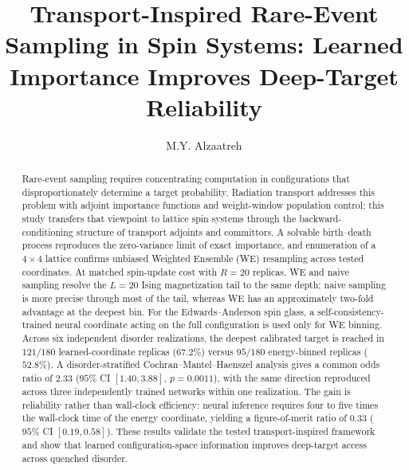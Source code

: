 \documentclass[a4paper,fleqn]{cas-sc}
\begin{document}
\let\WriteBookmarks\relax
\def\floatpagepagefraction{1}
\def\textpagefraction{.001}


\title[mode=title]{Transport-Inspired Rare-Event Sampling in Spin Systems: Learned
Importance Improves Deep-Target Reliability}

\author{M.Y. Alzaatreh}
\cormark[1]



\begin{abstract}
Rare-event sampling requires concentrating computation in configurations that disproportionately determine a target probability. Radiation transport addresses this problem with adjoint importance functions and weight-window population control; this study transfers that viewpoint to lattice spin systems through the backward-conditioning structure of transport adjoints and committors. A solvable birth--death process reproduces the zero-variance limit of exact importance, and enumeration of a $4\times4$ lattice confirms unbiased Weighted Ensemble (WE) resampling across tested coordinates. At matched spin-update cost with $R=20$ replicas, WE and naive sampling resolve the $L=20$ Ising magnetization tail to the same depth; naive sampling is more precise through most of the tail, whereas WE has an approximately two-fold advantage at the deepest bin. For the Edwards--Anderson spin glass, a self-consistency-trained neural coordinate acting on the full configuration is used only for WE binning. Across six independent disorder realizations, the deepest calibrated target is reached in $121/180$ learned-coordinate replicas ($67.2\%$) versus $95/180$ energy-binned replicas ($52.8\%$). A disorder-stratified Cochran--Mantel--Haenszel analysis gives a common odds ratio of $2.33$ ($95\%$ CI $[1.40,3.88]$, $p=0.0011$), with the same direction reproduced across three independently trained networks within one realization. The gain is reliability rather than wall-clock efficiency: neural inference requires four to five times the wall-clock time of the energy coordinate, yielding a figure-of-merit ratio of $0.33$ ($95\%$ CI $[0.19,0.58]$). These results validate the tested transport-inspired framework and show that learned configuration-space information improves deep-target access across quenched disorder.
\end{abstract}
\end{document}
